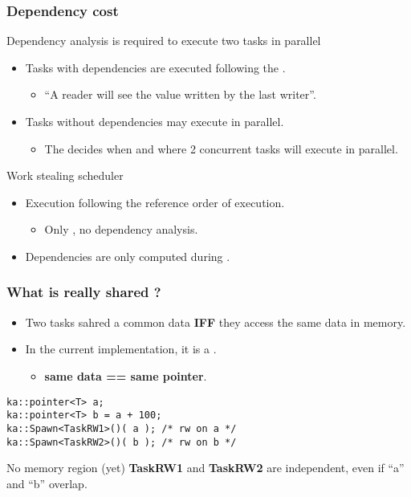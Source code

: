 \begin{frame}
  \frametitle{Dependency cost}
  \begin{block}{Dependency analysis is required to execute two tasks in parallel}
    \begin{itemize}
    \item Tasks with dependencies are executed following the .
      \begin{itemize}
      \item ``A reader will see the value written by the last writer''.
      \end{itemize}
    \item Tasks without dependencies may execute in parallel.
      \begin{itemize}
      \item The  decides when and where 2 concurrent tasks will execute in parallel. 
      \end{itemize}
    \end{itemize}
  \end{block}
  \pause
  \begin{alertblock}{Work stealing scheduler}
    \begin{itemize}
    \item Execution following the reference order of execution.
      \begin{itemize}
      \item Only  , no dependency analysis.
      \end{itemize}
    \item Dependencies are only computed during .
    \end{itemize}
  \end{alertblock}
\end{frame}
\begin{frame}[fragile]
  \frametitle{What is really shared ?}
  \begin{itemize}
  \item Two tasks sahred a common data \textbf{IFF} they access 
    the same data in memory.
  \item In the current implementation, it is a .
    \begin{itemize}
    \item {\bf same data == same pointer}.
    \end{itemize}
  \end{itemize}
\begin{block}{}
\begin{lstlisting}
ka::pointer<T> a;
ka::pointer<T> b = a + 100;
ka::Spawn<TaskRW1>()( a ); /* rw on a */
ka::Spawn<TaskRW2>()( b ); /* rw on b */
\end{lstlisting}
\end{block}
%
  \begin{alertblock}{No memory region (yet)}
  {\bf TaskRW1} and {\bf TaskRW2} are independent, even if 
  ``a'' and ``b'' overlap.
  \end{alertblock}
\end{frame}
